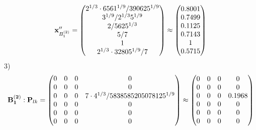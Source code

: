 \documentclass[10pt,a4paper]{article}
\begin{document}
	\[
		\bold{x}''_{B_1^{(2)}} = 
		\begin{pmatrix}
			{{2^ {1 / 3}} \cdot {6561^ {1 / 9}}} / {{390625^ {1 / 9}}} \\
			{{3^ {1 / 9}}} / {{2^ {1 / 3}}{5^ {1 / 9}}} \\
			{{2}} / {{5625^ {1 / 3}}} \\
			{{5}} / {{7}} \\
			{1}{} \\
			{{2^ {1 / 3}} \cdot {32805^ {1 / 9}}} / {{7}} \\
		\end{pmatrix}
		\approx
		\begin{pmatrix}
			0.8001   \\
			0.7499   \\
			0.1125   \\
			0.7143   \\
			1        \\
			0.5715   \\
		\end{pmatrix}
	\]
	3)
	\[
		\bold{B_1^{(2)}}: \bold{P}_{lk} = 
		\begin{pmatrix}
			{{0}}{} & {{0}}{} & {{0}}{} & {{0}}{} \\
			{{0}}{} & {{0}}{} & {{0}}{} & {{0}}{} \\
			{{0}}{} & {{0}}{} & {{0}}{} & {{7} \cdot {4^ {1 / 3}}} / {{5838585205078125^ {1 / 9}}} \\
			{{0}}{} & {{0}}{} & {{0}}{} & {{0}}{} \\
			{{0}}{} & {{0}}{} & {{0}}{} & {{0}}{} \\
			{{0}}{} & {{0}}{} & {{0}}{} & {{0}}{} \\
		\end{pmatrix}
		\approx
		\begin{pmatrix}
			0        & 0        & 0        & 0        \\
			0        & 0        & 0        & 0        \\
			0        & 0        & 0        & 0.1968   \\
			0        & 0        & 0        & 0        \\
			0        & 0        & 0        & 0        \\
			0        & 0        & 0        & 0        \\
		\end{pmatrix}
	\]
\end{document}
